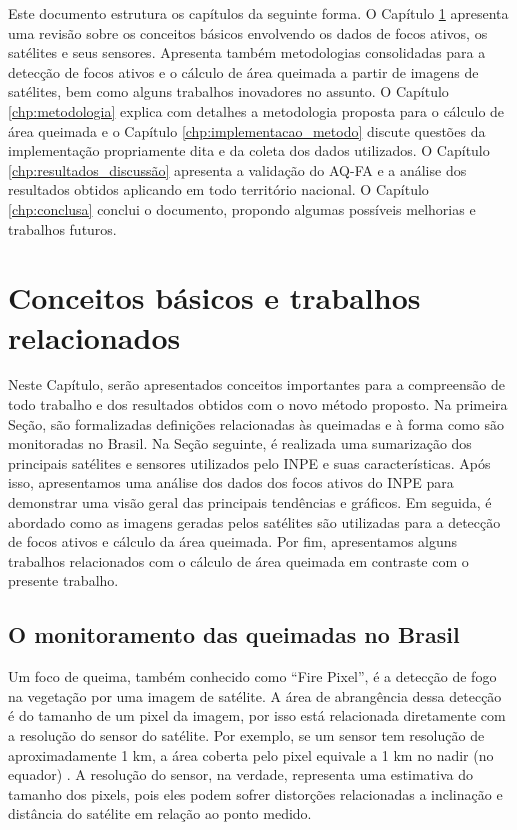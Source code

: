 \documentclass[cic,tc]{iiufrgs}
\begin{document}

Este documento estrutura os capítulos da seguinte forma. O Capítulo \ref{chp:conceitos_basicos} apresenta uma revisão sobre os conceitos básicos envolvendo os dados de focos ativos, os satélites e seus sensores. Apresenta também metodologias consolidadas para a detecção de focos ativos e o cálculo de área queimada a partir de imagens de satélites, bem como alguns trabalhos inovadores no assunto. O Capítulo \ref{chp:metodologia} explica com detalhes a metodologia proposta para o cálculo de área queimada e o Capítulo \ref{chp:implementacao_metodo} discute questões da implementação propriamente dita e da coleta dos dados utilizados. O Capítulo \ref{chp:resultados_discussão} apresenta a validação do AQ-FA e a análise dos resultados obtidos aplicando em todo território nacional. O Capítulo \ref{chp:conclusa} conclui o documento, propondo algumas possíveis melhorias e trabalhos futuros.



\chapter{Conceitos básicos e trabalhos relacionados}
\label{chp:conceitos_basicos}

Neste Capítulo, serão apresentados conceitos importantes para a compreensão de todo trabalho e dos resultados obtidos com o novo método proposto. Na primeira Seção, são formalizadas definições relacionadas às queimadas e à forma como são monitoradas no Brasil. Na Seção seguinte, é realizada uma sumarização dos principais satélites e sensores utilizados pelo INPE e suas características. Após isso, apresentamos uma análise dos dados dos focos ativos do INPE para demonstrar uma visão geral das principais tendências e gráficos. Em seguida, é abordado como as imagens geradas pelos satélites são utilizadas para a detecção de focos ativos e cálculo da área queimada. Por fim, apresentamos alguns trabalhos relacionados com o cálculo de área queimada em contraste com o presente trabalho. \par

\section{O monitoramento das queimadas no Brasil}

Um foco de queima, também conhecido como ``Fire Pixel'', é a detecção de fogo na vegetação por uma imagem de satélite. A área de abrangência dessa detecção é do tamanho de um pixel da imagem, por isso está relacionada diretamente com a resolução do sensor do satélite. Por exemplo, se um sensor tem resolução de aproximadamente 1 km, a área coberta pelo pixel equivale a 1 km no nadir (no equador) \cite{PerguntasFrequentesINPE}. A resolução do sensor, na verdade, representa uma estimativa do tamanho dos pixels, pois eles podem sofrer distorções relacionadas a inclinação e distância do satélite em relação ao ponto medido. 
\end{document}
